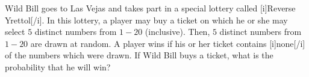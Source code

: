 Wild Bill goes to Las Vejas and takes part in a special lottery called [i]Reverse Yrettol[/i]. In this lottery, a player may buy a ticket on which he or she may select $5$ distinct numbers from $1-20$ (inclusive). Then, $5$ distinct numbers from $1-20$ are drawn at random. A player wins if his or her ticket contains [i]none[/i] of the numbers which were drawn. If Wild Bill buys a ticket, what is the probability that he will win?